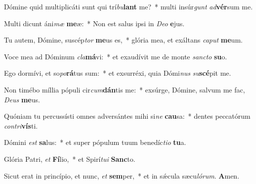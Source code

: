 \item Dómine quid multiplicáti sunt qui trí\textit{bu}\textbf{lant} me?~* multi insúr\textit{gunt} \textit{ad}\textbf{vér}sum me.
\item Multi dicunt áni\textit{mæ} \textbf{me}æ:~* Non est salus ipsi in \textit{De}\textit{o} \textbf{e}jus.
\item Tu autem, Dómine, suscép\textit{tor} \textbf{me}us es,~* glória mea, et exáltans \textit{ca}\textit{put} \textbf{me}um.
\item Voce mea ad Dóminum \textit{cla}\textbf{má}vi:~* et exaudívit me de monte \textit{sanc}\textit{to} \textbf{su}o.
\item Ego dormívi, et so\textit{po}\textbf{rá}tus sum:~* et exsurréxi, quia Dómi\textit{nus} \textit{su}\textbf{scé}pit me.
\item Non timébo míllia pópuli cir\textit{cum}\textbf{dán}tis me:~* exsúrge, Dómine, salvum me fac, \textit{De}\textit{us} \textbf{me}us.
\item Quóniam tu percussísti omnes adversántes mihi si\textit{ne} \textbf{cau}sa:~* dentes peccatórum \textit{con}\textit{tri}\textbf{vís}ti.
\item Dómini \textit{est} \textbf{sa}lus:~* et super pópulum tuum benedíc\textit{ti}\textit{o} \textbf{tu}a.
\item Glória Patri, \textit{et} \textbf{Fí}lio,~* et Spirí\textit{tu}\textit{i} \textbf{Sanc}to.
\item Sicut erat in princípio, et nunc, \textit{et} \textbf{sem}per,~* et in sǽcula sæcu\textit{ló}\textit{rum}. \textbf{A}men.
